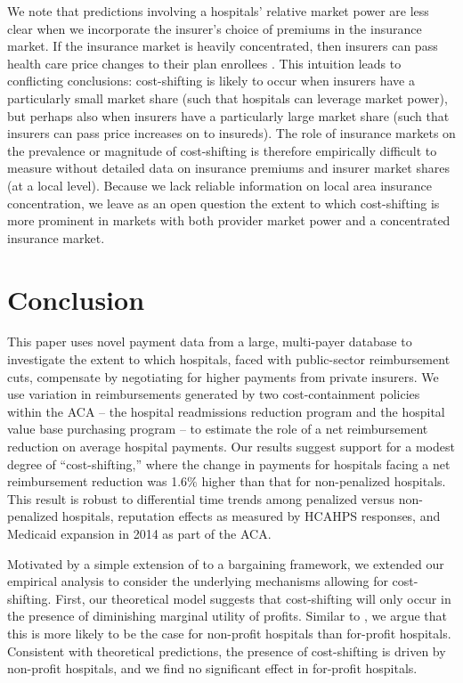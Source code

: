 \documentclass[12pt]{article}
\begin{document}
We note that predictions involving a hospitals' relative market power are less clear when we incorporate the insurer's choice of premiums in the insurance market. If the insurance market is heavily concentrated, then insurers can pass health care price changes to their plan enrollees \citep{trish2015,ho2017}. This intuition leads to conflicting conclusions: cost-shifting is likely to occur when insurers have a particularly small market share (such that hospitals can leverage market power), but perhaps also when insurers have a particularly large market share (such that insurers can pass price increases on to insureds). The role of insurance markets on the prevalence or magnitude of cost-shifting is therefore empirically difficult to measure without detailed data on insurance premiums and insurer market shares (at a local level). Because we lack reliable information on local area insurance concentration, we leave as an open question the extent to which cost-shifting is more prominent in markets with both provider market power and a concentrated insurance market.

\section{Conclusion}
\label{sec:Conclusion}
This paper uses novel payment data from a large, multi-payer database to investigate the extent to which hospitals, faced with public-sector reimbursement cuts, compensate by negotiating for higher payments from private insurers.  We use variation in reimbursements generated by two cost-containment policies within the ACA -- the hospital readmissions reduction program and the hospital value base purchasing program -- to estimate the role of a net reimbursement reduction on average hospital payments.  Our results suggest support for a modest degree of ``cost-shifting,''  where the change in payments for hospitals facing a net reimbursement reduction was 1.6$\%$ higher than that for non-penalized hospitals. This result is robust to differential time trends among penalized versus non-penalized hospitals, reputation effects as measured by HCAHPS responses, and Medicaid expansion in 2014 as part of the ACA.

Motivated by a simple extension of \cite{dranove1988} to a bargaining framework, we extended our empirical analysis to consider the underlying mechanisms allowing for cost-shifting. First, our theoretical model suggests that cost-shifting will only occur in the presence of diminishing marginal utility of profits. Similar to \cite{dranove1988}, we argue that this is more likely to be the case for non-profit hospitals than for-profit hospitals. Consistent with theoretical predictions, the presence of cost-shifting is driven by non-profit hospitals, and we find no significant effect in for-profit hospitals.
\end{document}
